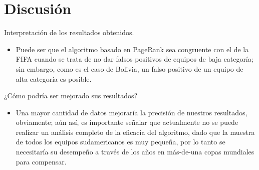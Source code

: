 \documentclass[twocolumn]{article}
\begin{document}



\section{Discusión}
 Interpretación de los resultados obtenidos.
\begin{itemize}
\item Puede ser que el algoritmo basado en PageRank sea congruente con el de la FIFA cuando se trata de no dar falsos positivos de equipos de baja categoría; sin embargo, como es el caso de Bolivia, un falso positivo de un equipo de alta categoría es posible.

\end{itemize}

¿Cómo podría ser mejorado sus resultados?
\begin{itemize}
\item Una mayor cantidad de datos mejoraría la precisión de nuestros resultados, obviamente; aún así, es importante señalar que actualmente no se puede realizar un análisis completo de la eficacia del algoritmo, dado que la muestra de todos los equipos sudamericanos es muy pequeña, por lo tanto se necesitaría su desempeño a través de los años en más-de-una copas mundiales para compensar.

\end{itemize}
 



\end{document}
